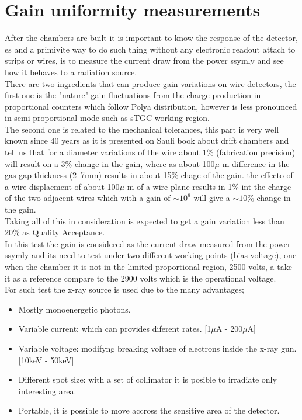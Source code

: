 \section{Gain uniformity measurements}

After the chambers are built it is important to know the response of the detector, es and a primivite way to do such thing without any electronic readout attach
to strips or wires, is to measure the current draw from the power ssymly and see how it behaves to a radiation source.\\ There are two ingredients that can
produce gain variations on wire detectors, the first one is the "nature" gain fluctuations from the charge production in proportional counters which follow
Polya distribution, however is less pronounced in semi-proportional mode such as sTGC working region.\\ The second one is related to the mechanical tolerances,
this part is very well known since 40 years as it is presented on Sauli book about drift chambers and tell us that for a diameter variations of the wire about
1\% (fabrication precision) will result on a 3\% change in the gain, where as about \unit{100}{$\mu$ m} difference in the gas gap thickness (\unit{2.7}{mm})
results in about 15\% chage of the gain. the effecto of a wire displacment of about \unit{100}{$\mu$ m} of a wire plane results in 1\% int the charge of the two
adjacent wires which with a gain of $\sim 10^6$ will give a $\sim 10\%$ change in the gain.\\ Taking all of this in consideration is expected to get a gain variation less
than 20\% as Quality Acceptance.\\ In this test the gain is considered as the current draw measured from the power ssymly and its need to test under two
different working points (bias voltage), one when the chamber it is not in the limited proportional region, 2500 volts, a take it as a reference compare to the
2900 volts which is the operational voltage.\\


For such test the x-ray source is used due to the many advantages;

\begin{itemize}
	\item Mostly monoenergetic photons.
	\item Variable current: which can provides diferent rates. [\unit{1}{$\mu$A} - \unit{200}{$\mu$A}]
	\item Variable voltage: modifyng breaking voltage of electrons inside the x-ray gun. [\unit{10}{keV} - \unit{50}{keV}]
	\item Different spot size: with a set of collimator it is posible to irradiate only interesting area.
	\item Portable, it is possible to move accross the sensitive area of the detector.
\end{itemize}

